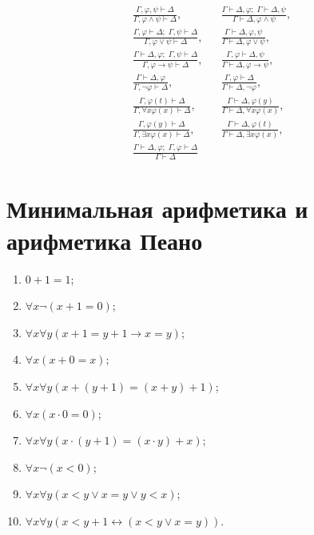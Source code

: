 \documentclass[a4paper,11pt]{article}
\begin{document}
\begin{align*}
&\frac{\Gamma,\varphi,\psi\vdash\Delta}{\Gamma,\varphi\land\psi\vdash\Delta},&&
\frac{\Gamma\vdash\Delta,\varphi;\;\Gamma\vdash\Delta,\psi}{\Gamma\vdash\Delta,\varphi\land\psi},
\\[0.3cm]
&\frac{\Gamma,\varphi\vdash\Delta;\;\Gamma,\psi\vdash\Delta}{\Gamma,\varphi\lor\psi\vdash\Delta},&&
\frac{\Gamma\vdash\Delta,\varphi,\psi}{\Gamma\vdash\Delta,\varphi\lor\psi},
\\[0.3cm]
&\frac{\Gamma\vdash\Delta,\varphi;\;\Gamma,\psi\vdash\Delta}{\Gamma,\varphi\rightarrow\psi\vdash\Delta},&&
\frac{\Gamma,\varphi\vdash\Delta,\psi}{\Gamma\vdash\Delta,\varphi\rightarrow\psi},
\\[0.3cm]
&\frac{\Gamma\vdash\Delta,\varphi}{\Gamma,\neg\varphi\vdash\Delta},&&
\frac{\Gamma,\varphi\vdash\Delta}{\Gamma\vdash\Delta,\neg\varphi},
\\[0.3cm]
&\frac{\Gamma,\varphi(t)\vdash\Delta}{\Gamma,\forall x\varphi(x)\vdash\Delta}, &&
\frac{\Gamma\vdash\Delta,\varphi(y)}{\Gamma\vdash\Delta,\forall x\varphi(x)},
\\[0.3cm]
&\frac{\Gamma,\varphi(y)\vdash\Delta}{\Gamma,\exists x\varphi(x)\vdash\Delta}, &&
\frac{\Gamma\vdash\Delta,\varphi(t)}{\Gamma\vdash\Delta,\exists x\varphi(x)},
\\[0.6cm]
&\frac{\Gamma\vdash\Delta,\varphi;\;\Gamma,\varphi\vdash\Delta}{\Gamma\vdash\Delta}
\end{align*}

\section{Минимальная арифметика и арифметика Пеано}

\begin{enumerate}
	\item $0 + 1 = 1$;

	\item $\forall x \neg(x + 1 = 0)$;

	\item $\forall x \forall y (x + 1 = y +1 \rightarrow x = y)$; 

	\item $\forall x (x+0 = x)$;

	\item $\forall x \forall y (x + (y + 1)= (x + y) + 1)$; 

	\item $\forall x (x\cdot 0 = 0)$;

	\item $\forall x \forall y (x\cdot (y + 1)= (x \cdot y) + x)$;  

	\item $\forall x \neg (x <0)$;

	\item $\forall x \forall y (x < y \vee x = y \vee y < x)$;  

	\item  $\forall x\forall y (x < y + 1 \leftrightarrow (x < y \vee x = y))$.
\end{enumerate}
\end{document}
